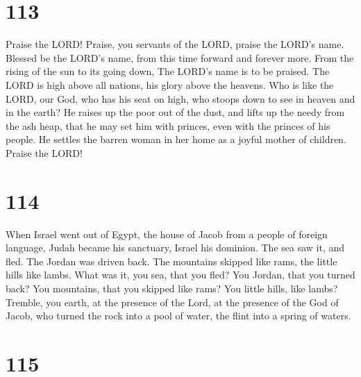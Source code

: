 \hypertarget{section-103}{%
\section{113}\label{section-103}}

 Praise the LORD! Praise, you servants of the LORD, praise
the LORD's name.  Blessed be the LORD's name, from this time
forward and forever more.  From the rising of the sun to its
going down, The LORD's name is to be praised.  The LORD is
high above all nations, his glory above the heavens.  Who is
like the LORD, our God, who has his seat on high,  who
stoops down to see in heaven and in the earth?  He raises up
the poor out of the dust, and lifts up the needy from the ash heap,
 that he may set him with princes, even with the princes of
his people.  He settles the barren woman in her home as a
joyful mother of children. Praise the LORD!

\hypertarget{section-104}{%
\section{114}\label{section-104}}

 When Israel went out of Egypt, the house of Jacob from a
people of foreign language,  Judah became his sanctuary,
Israel his dominion.  The sea saw it, and fled. The Jordan
was driven back.  The mountains skipped like rams, the
little hills like lambs.  What was it, you sea, that you
fled? You Jordan, that you turned back?  You mountains, that
you skipped like rams? You little hills, like lambs? 
Tremble, you earth, at the presence of the Lord, at the presence of the
God of Jacob,  who turned the rock into a pool of water, the
flint into a spring of waters.

\hypertarget{section-105}{%
\section{115}\label{section-105}}

